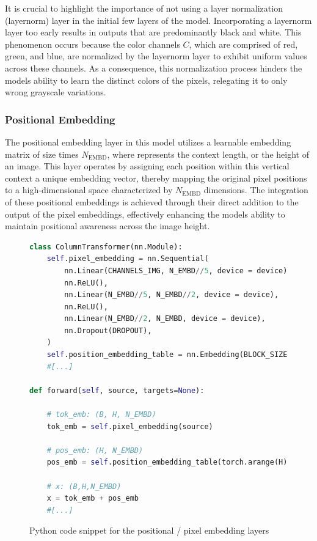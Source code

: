    It is crucial to highlight the importance of not using a layer normalization (layernorm) layer in the initial few layers of the model. Incorporating a layernorm layer too early results in outputs that are predominantly black and white. This phenomenon occurs because the color channels \(C\), which are comprised of red, green, and blue, are normalized by the layernorm layer to exhibit uniform values across these channels. As a consequence, this normalization process hinders the models ability to learn the distinct colors of the pixels, relegating it to only wrong grayscale variations.

    \subsubsection{Positional Embedding}
    \label{sec:CIT_PositionalEmbedding}

    The positional embedding layer in this model utilizes a learnable embedding matrix of size  times \(N_{\text{EMBD}}\), where  represents the context length, or the height of an image. This layer operates by assigning each position within this vertical context a unique embedding vector, thereby mapping the original pixel positions to a high-dimensional space characterized by \(N_{\text{EMBD}}\) dimensions. The integration of these positional embeddings is achieved through their direct addition to the output of the pixel embeddings, effectively enhancing the models ability to maintain positional awareness across the image height.


\begin{figure}[H]
    \centering
    \begin{lstlisting}[language=Python]
class ColumnTransformer(nn.Module):
    self.pixel_embedding = nn.Sequential(
        nn.Linear(CHANNELS_IMG, N_EMBD//5, device = device),
        nn.ReLU(),
        nn.Linear(N_EMBD//5, N_EMBD//2, device = device),
        nn.ReLU(),
        nn.Linear(N_EMBD//2, N_EMBD, device = device),
        nn.Dropout(DROPOUT),
    )
    self.position_embedding_table = nn.Embedding(BLOCK_SIZE, N_EMBD)
    #[...]

def forward(self, source, targets=None):

    # tok_emb: (B, H, N_EMBD)
    tok_emb = self.pixel_embedding(source) 

    # pos_emb: (H, N_EMBD)
    pos_emb = self.position_embedding_table(torch.arange(H)) 

    # x: (B,H,N_EMBD)
    x = tok_emb + pos_emb 
    #[...]
\end{lstlisting}
\caption{Python code snippet for the positional / pixel embedding layers}
\label{fig:posEmbend_CIT}
\end{figure}
   
